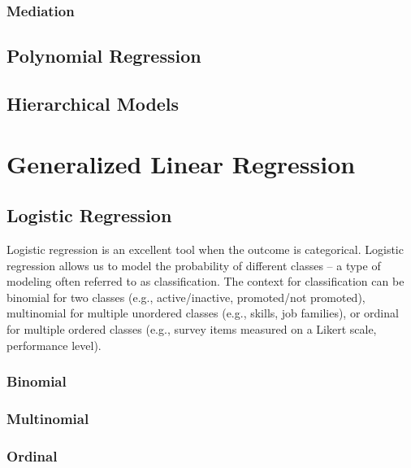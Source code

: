 \documentclass[]{book}
\begin{document}
\hypertarget{mediation}{%
\subsection{Mediation}\label{mediation}}

\hypertarget{polynomial-regression}{%
\section{Polynomial Regression}\label{polynomial-regression}}

\hypertarget{hierarchical-models}{%
\section{Hierarchical Models}\label{hierarchical-models}}

\hypertarget{generalized-linear-regression}{%
\chapter{Generalized Linear Regression}\label{generalized-linear-regression}}

\hypertarget{logistic-regression}{%
\section{Logistic Regression}\label{logistic-regression}}

Logistic regression is an excellent tool when the outcome is categorical. Logistic regression allows us to model the probability of different classes -- a type of modeling often referred to as classification. The context for classification can be binomial for two classes (e.g., active/inactive, promoted/not promoted), multinomial for multiple unordered classes (e.g., skills, job families), or ordinal for multiple ordered classes (e.g., survey items measured on a Likert scale, performance level).

\hypertarget{binomial}{%
\subsection{Binomial}\label{binomial}}

\hypertarget{multinomial}{%
\subsection{Multinomial}\label{multinomial}}

\hypertarget{ordinal}{%
\subsection{Ordinal}\label{ordinal}}
\end{document}
